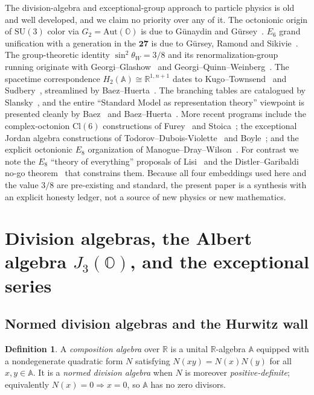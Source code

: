\documentclass[aps,prresearch,onecolumn,amsmath,amssymb,nofootinbib]{revtex4-2}
\theoremstyle{plain}\newtheorem{theorem}{Theorem}[section]\newtheorem{proposition}[theorem]{Proposition}\newtheorem{lemma}[theorem]{Lemma}\newtheorem{corollary}[theorem]{Corollary}
\theoremstyle{definition}\newtheorem{definition}[theorem]{Definition}\newtheorem{conjecture}[theorem]{Conjecture}
\theoremstyle{remark}\newtheorem{remark}[theorem]{Remark}
\begin{document}
The division-algebra and exceptional-group approach to particle physics is old and well developed, and we claim no priority over any of it. The octonionic origin of $\mathrm{SU}(3)$ color via $G_2=\mathrm{Aut}(\mathbb{O})$ is due to G\"unaydin and G\"ursey~\cite{GunaydinGursey1973}. $E_6$ grand unification with a generation in the $\mathbf{27}$ is due to G\"ursey, Ramond and Sikivie~\cite{GRS1976}. The group-theoretic identity $\sin^2\theta_W=3/8$ and its renormalization-group running originate with Georgi--Glashow~\cite{GeorgiGlashow1974} and Georgi--Quinn--Weinberg~\cite{GeorgiQuinnWeinberg1974}. The spacetime correspondence $H_2(\mathbb{A})\cong\mathbb{R}^{1,n+1}$ dates to Kugo--Townsend~\cite{KugoTownsend1983} and Sudbery~\cite{Sudbery1984}, streamlined by Baez--Huerta~\cite{BaezHuertaSUSY}. The branching tables are catalogued by Slansky~\cite{Slansky1981}, and the entire ``Standard Model as representation theory'' viewpoint is presented cleanly by Baez~\cite{Baez2002} and Baez--Huerta~\cite{BaezHuerta2010}. More recent programs include the complex-octonion $\mathrm{Cl}(6)$ constructions of Furey~\cite{Furey2014,Furey2016} and Stoica~\cite{Stoica2018}; the exceptional Jordan algebra constructions of Todorov--Dubois-Violette~\cite{TodorovDV2018} and Boyle~\cite{Boyle2020}; and the explicit octonionic $E_8$ organization of Manogue--Dray--Wilson~\cite{MDW2022}. For contrast we note the $E_8$ ``theory of everything'' proposals of Lisi~\cite{Lisi2007,Lisi2010} and the Distler--Garibaldi no-go theorem~\cite{DistlerGaribaldi} that constrains them. Because all four embeddings used here and the value $3/8$ are pre-existing and standard, the present paper is a synthesis with an explicit honesty ledger, not a source of new physics or new mathematics.

\section{Division algebras, the Albert algebra $J_3(\mathbb{O})$, and the exceptional series}
\label{sec:F1}

\subsection{Normed division algebras and the Hurwitz wall}

\begin{definition}
A \emph{composition algebra} over $\mathbb{R}$ is a unital $\mathbb{R}$-algebra $\mathbb{A}$ equipped with a nondegenerate quadratic form $N$ satisfying $N(xy)=N(x)N(y)$ for all $x,y\in\mathbb{A}$. It is a \emph{normed division algebra} when $N$ is moreover \emph{positive-definite}; equivalently $N(x)=0\Rightarrow x=0$, so $\mathbb{A}$ has no zero divisors.
\end{definition}
\end{document}
